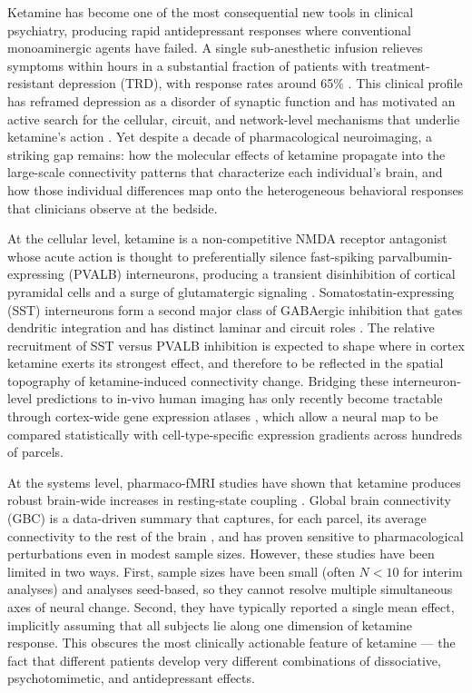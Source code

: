 \documentclass[11pt]{article}
\begin{document}
Ketamine has become one of the most consequential new tools in clinical
psychiatry, producing rapid antidepressant responses where conventional
monoaminergic agents have failed. A single sub-anesthetic infusion relieves
symptoms within hours in a substantial fraction of patients with
treatment-resistant depression (TRD), with response rates around 65\%
\citep{berman2000ketamine,zarate2006randomized,murrough2013antidepressant}.
This clinical profile has reframed depression as a disorder of synaptic
function and has motivated an active search for the cellular, circuit, and
network-level mechanisms that underlie ketamine's action
\citep{duman2016synaptic,krystal2019ketamine}. Yet despite a decade of
pharmacological neuroimaging, a striking gap remains: how the molecular
effects of ketamine propagate into the large-scale connectivity patterns
that characterize each individual's brain, and how those individual
differences map onto the heterogeneous behavioral responses that clinicians
observe at the bedside.

At the cellular level, ketamine is a non-competitive NMDA receptor
antagonist whose acute action is thought to preferentially silence
fast-spiking parvalbumin-expressing (PVALB) interneurons, producing a
transient disinhibition of cortical pyramidal cells and a surge of
glutamatergic signaling
\citep{krystal1994subanesthetic,moghaddam1997activation,homayoun2007nmda}.
Somatostatin-expressing (SST) interneurons form a second major class of
GABAergic inhibition that gates dendritic integration and has distinct
laminar and circuit roles \citep{rudy2011three,tremblay2016gabaergic}. The
relative recruitment of SST versus PVALB inhibition is expected to shape
where in cortex ketamine exerts its strongest effect, and therefore to be
reflected in the spatial topography of ketamine-induced connectivity change.
Bridging these interneuron-level predictions to in-vivo human imaging has
only recently become tractable through cortex-wide gene expression atlases
\citep{hawrylycz2012anatomically,burt2018hierarchy}, which allow a neural
map to be compared statistically with cell-type-specific expression
gradients across hundreds of parcels.

At the systems level, pharmaco-fMRI studies have shown that ketamine produces
robust brain-wide increases in resting-state coupling
\citep{driesen2013relationship,anticevic2014ncs,abdallah2018ketamine}. Global
brain connectivity (GBC) is a data-driven summary that captures, for each
parcel, its average connectivity to the rest of the brain
\citep{cole2010globalbrain}, and has proven sensitive to pharmacological
perturbations even in modest sample sizes. However, these studies have been
limited in two ways. First, sample sizes have been small (often $N<10$ for
interim analyses) and analyses seed-based, so they cannot resolve multiple
simultaneous axes of neural change. Second, they have typically reported a
single mean effect, implicitly assuming that all subjects lie along one
dimension of ketamine response. This obscures the most clinically actionable
feature of ketamine --- the fact that different patients develop very
different combinations of dissociative, psychotomimetic, and antidepressant
effects.
\end{document}

